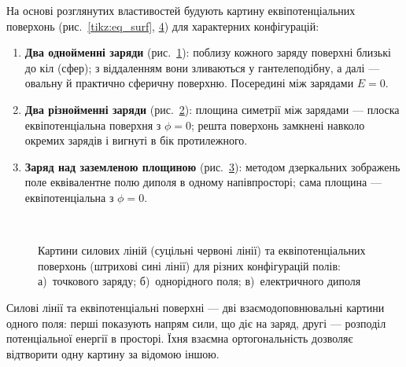 На основі розглянутих властивостей будують картину еквіпотенціальних поверхонь (рис.~\ref{tikz:eq_surf}, \ref{fig:equipotentials_all}) для характерних конфігурацій:
\begin{enumerate}
    \item \textbf{Два однойменні заряди} (рис.~\ref{fig:like}): поблизу кожного заряду поверхні близькі до кіл (сфер); з віддаленням вони зливаються у гантелеподібну, а далі — овальну й практично сферичну поверхню. Посередині між зарядами $E=0$.
    \item \textbf{Два різнойменні заряди} (рис.~\ref{fig:opposite}): площина симетрії між зарядами — плоска еквіпотенціальна поверхня з $\phi=0$; решта поверхонь замкнені навколо окремих зарядів і вигнуті в бік протилежного.
    \item \textbf{Заряд над заземленою площиною} (рис.~\ref{fig:plane}): методом дзеркальних зображень поле еквівалентне полю диполя в одному напівпросторі; сама площина — еквіпотенціальна з $\phi=0$.
\end{enumerate}

\begin{figure}[h!]
  \centering
  \begin{subfigure}[t]{0.45\linewidth}
    \centering
        
    \caption{}
    \label{fig:like}
  \end{subfigure}
  \hfill
  \begin{subfigure}[t]{0.45\linewidth}
    \centering
    
    \caption{}
    \label{fig:opposite}
  \end{subfigure}
  \\
  \begin{subfigure}[t]{1\linewidth}
    \centering
    
    \caption{}
    \label{fig:plane}
  \end{subfigure}

  \caption{Картини силових ліній (суцільні червоні лінії) та еквіпотенціальних поверхонь (штрихові сині лінії) для різних конфігурацій полів: а)~точкового заряду; б)~однорідного поля; в)~електричного диполя}
  \label{fig:equipotentials_all}
\end{figure}

Силові лінії та еквіпотенціальні поверхні — дві взаємодоповнювальні картини одного поля: перші показують напрям сили, що діє на заряд, другі — розподіл потенціальної енергії в просторі. Їхня взаємна ортогональність дозволяє відтворити одну картину за відомою іншою.


